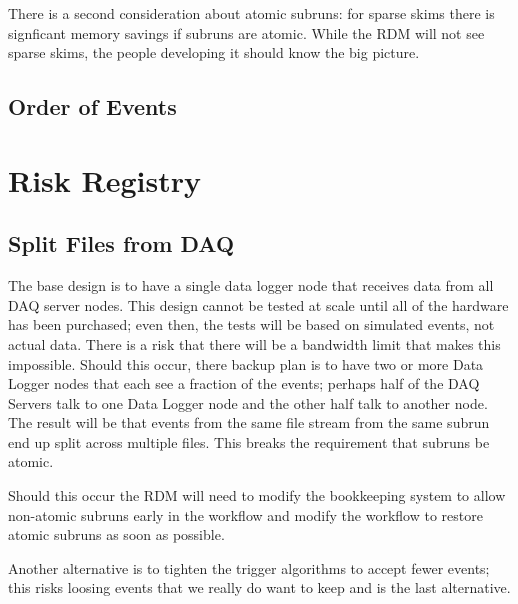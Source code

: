 There is a second consideration about atomic subruns:
for sparse skims there is signficant memory savings if subruns are atomic.
While the RDM will not see sparse skims, the people developing it should know the big picture.


\section{Order of Events}

\chapter{Risk Registry}
\label{app:RisKRegistry}

\section{Split Files from DAQ}
\label{app:Risk:SplitFiles}

The base design is to have a single data logger node that receives data from all DAQ server nodes.
This design cannot be tested at scale until all of the hardware has been purchased;
even then, the tests will be based on simulated events, not actual data.
There is a risk that there will be a bandwidth limit that makes this impossible.
Should this occur, there backup plan is to have two or more Data Logger nodes
that each see a fraction of the events;
perhaps half of the DAQ Servers talk to one Data Logger node and the other half talk to another node.
The result will be that events from the same file stream from the same subrun end up split across multiple files.
This breaks the requirement that subruns be atomic.

Should this occur the RDM will need to modify the bookkeeping system to allow non-atomic subruns early
in the workflow and modify the workflow to restore atomic subruns as soon as possible.

Another alternative is to tighten the trigger algorithms to accept fewer events;
this risks loosing events that we really do want to keep and is the last alternative.

\clearpage
{}
{}
\printbibliography


